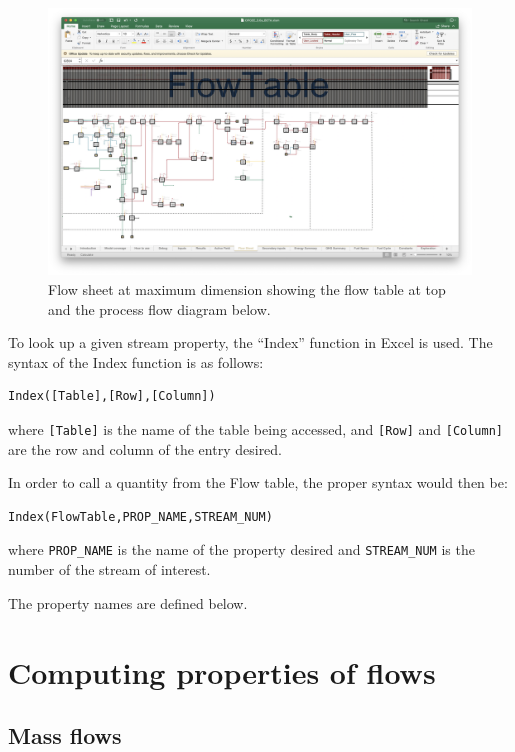 \documentclass[11pt]{report}
\begin{document}
\begin{figure}[!h]
\includegraphics[width=0.70\columnwidth]{images/FlowSheet.png}
\caption{Flow sheet at maximum dimension showing the flow table at top and the process flow diagram below.}
\label{fig:FlowSheet}
\end{figure}

To look up a given stream property, the ``Index'' function in Excel is used. The syntax of the Index function is as follows:
\begin{verbatim}
Index([Table],[Row],[Column])
\end{verbatim}
where \verb+[Table]+ is the name of the table being accessed, and \verb+[Row]+ and \verb+[Column]+ are the row and column of the entry desired.

In order to call a quantity from the Flow table, the proper syntax would then be:
\begin{verbatim}
Index(FlowTable,PROP_NAME,STREAM_NUM)
\end{verbatim}
where \verb+PROP_NAME+ is the name of the property desired and \verb+STREAM_NUM+ is the number of the stream of interest.

The property names are defined below.

\section{Computing properties of flows}

\subsection{Mass flows}
\end{document}
